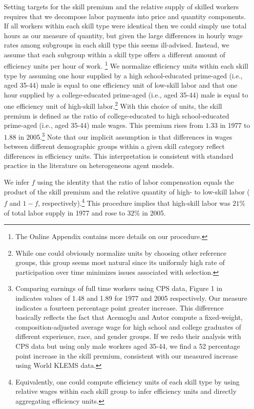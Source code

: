\documentclass[12pt,english]{article}
\begin{document}
{\normalsize Setting targets for the skill premium and the relative supply
of skilled workers requires that we decompose labor payments into price and
quantity components. If all workers within each skill type were identical
then we could simply use total hours as our measure of quantity, but given
the large differences in hourly wage rates among subgroups in each skill
type this seems ill-advised. Instead, we assume that each subgroup within a
skill type offers a different amount of efficiency units per hour of work.%
\footnote{%
The Online Appendix contains more details on our procedure.} We normalize
efficiency units within each skill type by assuming one hour supplied by a
high school-educated prime-aged (i.e., aged 35-44) male is equal to one
efficiency unit of low-skill labor and that one hour supplied by a
college-educated prime-aged (i.e., aged 35-44) male is equal to one
efficiency unit of high-skill labor.\footnote{%
While one could obviously normalize units by choosing other reference
groups, this group seems most natural since its uniformly high rate of
participation over time minimizes issues associated with selection.} With
this choice of units, the skill premium is defined as the ratio of
college-educated to high school-educated prime-aged (i.e., aged 35-44) male
wages. This premium rises from $1.33$ in 1977 to $1.88$ in 2005.\footnote{%
Comparing earnings of full time workers using CPS data, Figure 1 in %
\citet{AceAut11} indicates values of 1.48 and 1.89 for 1977 and 2005
respectively. Our measure indicates a fourteen percentage point greater
increase. This difference basically reflects the fact that Acemoglu and
Autor compute a fixed-weight, composition-adjusted average wage for high
school and college graduates of different experience, race, and gender
groups. If we redo their analysis with CPS data but using only male workers
aged 35-44, we find a 52 percentage point increase in the skill premium,
consistent with our measured increase using World KLEMS data.} Note that our
implicit assumption is that differences in wages between different
demographic groups within a given skill category reflect differences in
efficiency units. This interpretation is consistent with standard practice
in the literature on heterogeneous agent models. }

{\normalsize We infer $f$ using the identity that the ratio of labor
compensation equals the product of the skill premium and the relative
quantity of high- to low-skill labor ($f$ and $1-f$, respectively).\footnote{%
Equivalently, one could compute efficiency units of each skill type by using
relative wages within each skill group to infer efficiency units and
directly aggregating efficiency units.} This procedure implies that
high-skill labor was $21\%$ of total labor supply in 1977 and rose to $32\%$
in 2005. }
\end{document}
